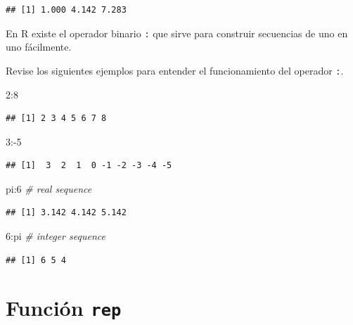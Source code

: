 \documentclass[10pt,]{krantz}
\makeatletter
\newenvironment{Shaded}{\begin{snugshade}}{\end{snugshade}}
\newcommand{\DecValTok}[1]{\textcolor[rgb]{0.00,0.00,0.81}{{#1}}}
\newcommand{\CommentTok}[1]{\textcolor[rgb]{0.56,0.35,0.01}{\textit{{#1}}}}
\newcommand{\NormalTok}[1]{{#1}}
\let\proglang=\textsf
\newenvironment{kframe}{%
\medskip{}
\setlength{\fboxsep}{.8em}
 \def\at@end@of@kframe{}%
 \ifinner\ifhmode%
  \def\at@end@of@kframe{\end{minipage}}%
  \begin{minipage}{\columnwidth}%
 \fi\fi%
 \def\FrameCommand##1{\hskip\@totalleftmargin \hskip-\fboxsep
 \colorbox{shadecolor}{##1}\hskip-\fboxsep
     \hskip-\linewidth \hskip-\@totalleftmargin \hskip\columnwidth}%
 \MakeFramed {\advance\hsize-\width
   \@totalleftmargin\z@ \linewidth\hsize
   \@setminipage}}%
 {\par\unskip\endMakeFramed%
 \at@end@of@kframe}
\renewenvironment{Shaded}{\begin{kframe}}{\end{kframe}}
\let\BeginKnitrBlock\begin \let\EndKnitrBlock\end
\makeatother
\begin{document}
\begin{verbatim}
## [1] 1.000 4.142 7.283
\end{verbatim}

\BeginKnitrBlock{rmdnote}
En \proglang{R} existe el operador binario \texttt{:} que sirve para
construir secuencias de uno en uno fácilmente.
\EndKnitrBlock{rmdnote}

Revise los siguientes ejemplos para entender el funcionamiento del
operador \texttt{:}.

\begin{Shaded}
\begin{Highlighting}[]
\DecValTok{2}\NormalTok{:}\DecValTok{8}
\end{Highlighting}
\end{Shaded}

\begin{verbatim}
## [1] 2 3 4 5 6 7 8
\end{verbatim}

\begin{Shaded}
\begin{Highlighting}[]
\DecValTok{3}\NormalTok{:-}\DecValTok{5}
\end{Highlighting}
\end{Shaded}

\begin{verbatim}
## [1]  3  2  1  0 -1 -2 -3 -4 -5
\end{verbatim}

\begin{Shaded}
\begin{Highlighting}[]
\NormalTok{pi:}\DecValTok{6}  \CommentTok{# real sequence}
\end{Highlighting}
\end{Shaded}

\begin{verbatim}
## [1] 3.142 4.142 5.142
\end{verbatim}

\begin{Shaded}
\begin{Highlighting}[]
\DecValTok{6}\NormalTok{:pi  }\CommentTok{# integer sequence}
\end{Highlighting}
\end{Shaded}

\begin{verbatim}
## [1] 6 5 4
\end{verbatim}

\section{\texorpdfstring{Función \texttt{rep} 
}{Función rep  }}\label{funcion-rep}
\end{document}
